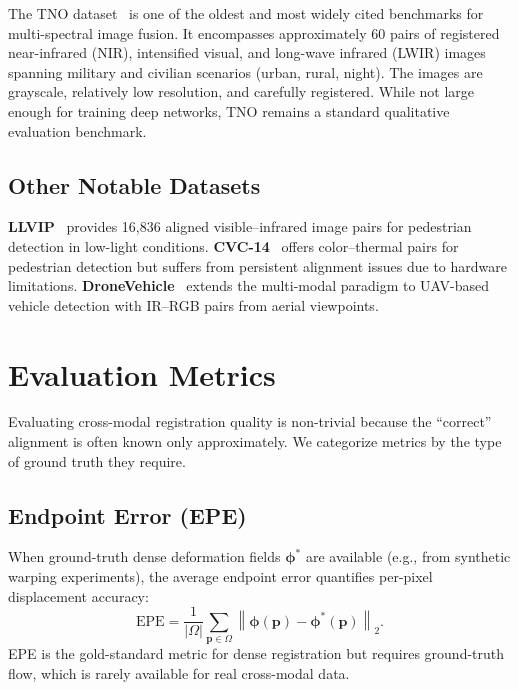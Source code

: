 The TNO dataset~\cite{toet2017tno} is one of the oldest and most widely cited
benchmarks for multi-spectral image fusion. It encompasses approximately 60
pairs of registered near-infrared (NIR), intensified visual, and long-wave
infrared (LWIR) images spanning military and civilian scenarios (urban, rural,
night). The images are grayscale, relatively low resolution, and carefully
registered. While not large enough for training deep networks, TNO remains a
standard qualitative evaluation benchmark.

\subsection{Other Notable Datasets}
\label{subsec:other-datasets}

\textbf{LLVIP}~\cite{jia2021llvip} provides 16,836 aligned visible--infrared
image pairs for pedestrian detection in low-light conditions.
\textbf{CVC-14}~\cite{gonzalez2016pedestrian} offers color--thermal pairs for
pedestrian detection but suffers from persistent alignment issues due to
hardware limitations. \textbf{DroneVehicle}~\cite{sun2022drone} extends the
multi-modal paradigm to UAV-based vehicle detection with IR--RGB pairs from
aerial viewpoints.


\section{Evaluation Metrics}
\label{sec:evaluation}

Evaluating cross-modal registration quality is non-trivial because the
``correct'' alignment is often known only approximately. We categorize metrics
by the type of ground truth they require.

\subsection{Endpoint Error (EPE)}
\label{subsec:epe}

When ground-truth dense deformation fields $\boldsymbol{\phi}^*$ are available
(e.g., from synthetic warping experiments), the average endpoint error quantifies
per-pixel displacement accuracy:
\begin{equation}
  \mathrm{EPE} = \frac{1}{|\Omega|} \sum_{\mathbf{p} \in \Omega}
    \left\| \boldsymbol{\phi}(\mathbf{p})
    - \boldsymbol{\phi}^*(\mathbf{p}) \right\|_2.
  \label{eq:epe}
\end{equation}
EPE is the gold-standard metric for dense registration but requires
ground-truth flow, which is rarely available for real cross-modal data.

